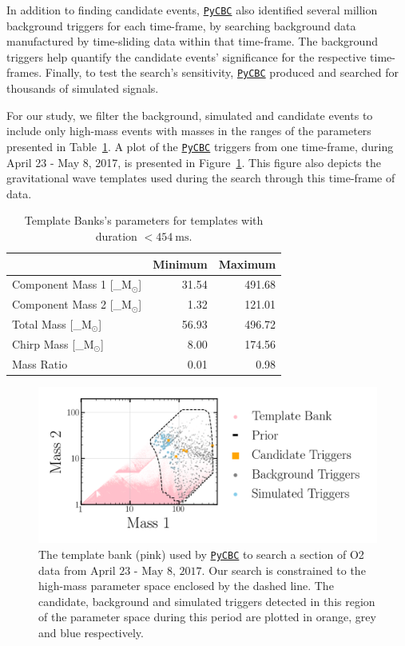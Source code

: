 \documentclass[%
 nofootinbib,
 amsmath,amssymb,
 aps,
 twocolumn
]{revtex4-2}
\newcommand{\pycbc}{{\sc \href{https://pycbc.org/}{\texttt{PyCBC}}}\xspace}
\newcommand{\mathcmd}[1]{{\sc \relax\ifmmode#1\else $#1$\fi}\xspace}
\newcommand{\msun}{\mathcmd{\text{M}_\odot}}
\begin{document}
In addition to finding candidate events, \pycbc also identified several million background triggers for each time-frame, by searching background data manufactured by time-sliding data within that time-frame. The background triggers help quantify the candidate events' significance for the respective time-frames. Finally, to test the search's sensitivity, \pycbc produced and searched for thousands of simulated signals. 

For our study, we filter the background, simulated and candidate events to include only high-mass events with masses in the ranges of the parameters presented in Table~\ref{tab:parameters}. A plot of the \pycbc triggers from one time-frame, during April 23 - May 8, 2017, is presented in Figure~\ref{fig:templateBank}. This figure also depicts the gravitational wave templates used during the search through this time-frame of data. 


\begin{table}[t]

\caption[BBH parameters corresponding to duration $<454\ \text{ms}$]{\label{tab:parameters}Template Banks's parameters for templates with duration $<454 \ \text{ms}$.}
\centering
\begin{tabular}{lrr}
\toprule
  & Minimum & Maximum\\
\midrule
Component Mass 1 [\msun] & 31.54 & 491.68\\
Component Mass 2 [\msun] & 1.32 & 121.01\\
Total Mass [\msun] & 56.93 & 496.72\\
Chirp Mass [\msun] & 8.00 & 174.56\\
Mass Ratio & 0.01 & 0.98\\
\end{tabular}
\end{table}



\begin{figure}[!ht]

{\centering \includegraphics[width=0.75\linewidth]{images/template_bank.png}

}
\caption[High-mass BCR search space.]{The template bank (pink) used by \pycbc to search a section of O2 data from $\text{April 23 - May 8, 2017}$. Our search is constrained to the high-mass parameter space enclosed by the dashed line. The candidate, background and simulated triggers detected in this region of the parameter space during this period are plotted in orange, grey and blue respectively.  }\label{fig:templateBank}
\end{figure}
\end{document}
